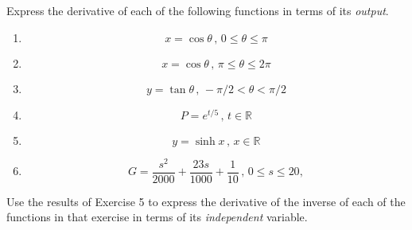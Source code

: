 \documentclass{ximera}
\begin{document}
\begin{exercise}  \label{Eggghhybvbxzzz}
Express the derivative of each of the following functions in terms of its \emph{output}.
\begin{enumerate}
\item 
\[
       x = \cos\theta \, , \, 0\leq \theta \leq \pi
\]


\item 
\[
       x = \cos\theta \, , \, \pi\leq \theta \leq 2\pi
\]

\item 
\[
       y = \tan\theta \, , \, -\pi/2 < \theta < \pi/2
\]

\item
\[
     P = e^{t/5} \, , \, t\in \mathbb{R} 
\]

\item 
\[
  y = \sinh x \, , \, x\in \mathbb{R} 
\]

\item
\[
   G = \frac{s^2}{2000} + \frac{23s}{1000} + \frac{1}{10} \, , \, 0\leq s\leq 20, 
\]

\end{enumerate}

\end{exercise}

\begin{exercise} \label{E898gbfgg}
Use the results of Exercise 5 to express the derivative of the inverse of each of the functions in that exercise in terms of its \emph{independent} variable.
\end{exercise}
\end{document}

